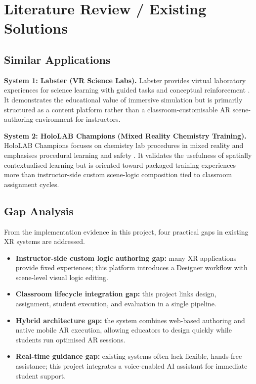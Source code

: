 \documentclass[12pt,a4paper]{article}
\begin{document}
\section{Literature Review / Existing Solutions}

\subsection{Similar Applications}

\textbf{System 1: Labster (VR Science Labs).}\quad
Labster provides virtual laboratory experiences for science learning with guided tasks
and conceptual reinforcement \cite{labster}. It demonstrates the educational value of
immersive simulation but is primarily structured as a content platform rather than a
classroom-customisable AR scene-authoring environment for instructors.

\textbf{System 2: HoloLAB Champions (Mixed Reality Chemistry Training).}\quad
HoloLAB Champions focuses on chemistry lab procedures in mixed reality and emphasises
procedural learning and safety \cite{hololab}. It validates the usefulness of spatially
contextualised learning but is oriented toward packaged training experiences more than
instructor-side custom scene-logic composition tied to classroom assignment cycles.

\subsection{Gap Analysis}

From the implementation evidence in this project, four practical gaps in existing XR
systems are addressed.

\begin{itemize}[leftmargin=1.4cm]
  \item \textbf{Instructor-side custom logic authoring gap:} many XR applications
        provide fixed experiences; this platform introduces a Designer workflow with
        scene-level visual logic editing.
  \item \textbf{Classroom lifecycle integration gap:} this project links design,
        assignment, student execution, and evaluation in a single pipeline.
  \item \textbf{Hybrid architecture gap:} the system combines web-based authoring and
        native mobile AR execution, allowing educators to design quickly while students
        run optimised AR sessions.
  \item \textbf{Real-time guidance gap:} existing systems often lack flexible, hands-free
        assistance; this project integrates a voice-enabled AI assistant for immediate
        student support.
\end{itemize}
\end{document}
